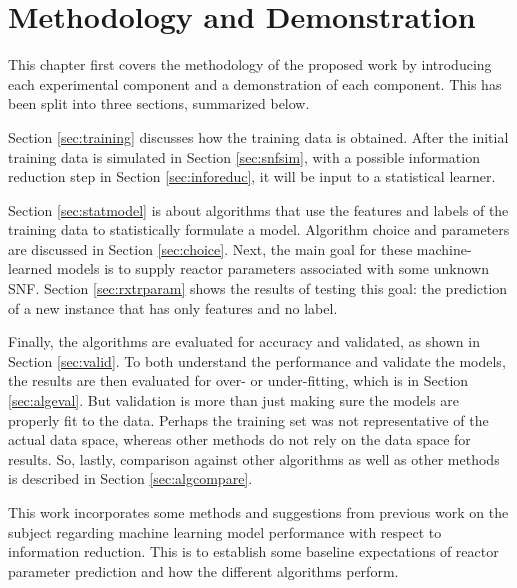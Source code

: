 \chapter{Methodology and Demonstration}
\label{ch:demo_method}

This chapter first covers the methodology of the proposed work by introducing
each experimental component and a demonstration of each component. This has been 
split into three sections, summarized below.

Section \ref{sec:training} discusses how the training data is obtained.  After
the initial training data is simulated in Section \ref{sec:snfsim}, with a
possible information reduction step in Section \ref{sec:inforeduc}, it will be
input to a statistical learner. 

Section \ref{sec:statmodel} is about algorithms that use the features and
labels of the training data to statistically formulate a model. Algorithm
choice and parameters are discussed in Section \ref{sec:choice}.  Next, the
main goal for these machine-learned models is to supply reactor parameters
associated with some unknown \gls{SNF}. Section \ref{sec:rxtrparam} shows the
results of testing this goal: the prediction of a new instance that has only
features and no label.  

Finally, the algorithms are evaluated for accuracy and validated, as shown
in Section \ref{sec:valid}.  To both understand the performance and validate
the models, the results are then evaluated for over- or under-fitting, which is
in Section \ref{sec:algeval}.  But validation is more than just making sure the
models are properly fit to the data.  Perhaps the training set was not
representative of the actual data space, whereas other methods do not rely on
the data space for results. So, lastly, comparison against other algorithms as
well as other methods is described in Section \ref{sec:algcompare}.

This work incorporates some methods and suggestions from previous work on the
subject \cite{dayman_feasibility_2013} regarding machine learning model
performance with respect to information reduction.  This is to establish some
baseline expectations of reactor parameter prediction and how the different
algorithms perform. 

